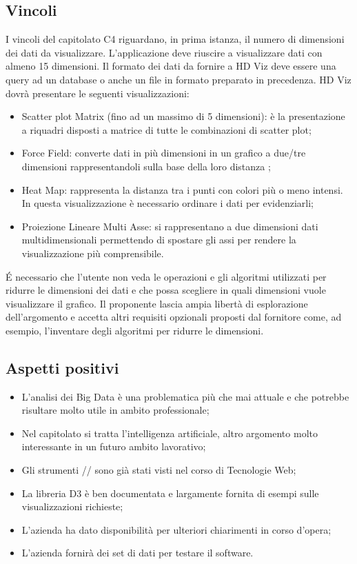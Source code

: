 \subsection{Vincoli}
I vincoli del capitolato C4 riguardano, in prima istanza, il numero di dimensioni dei dati da visualizzare. L'applicazione deve riuscire a visualizzare dati con almeno 15 dimensioni. 
Il formato dei dati da fornire a HD Viz deve essere una query ad un database o anche un file in formato  preparato in precedenza.
HD Viz dovrà presentare le seguenti visualizzazioni: 
\begin{itemize}
\item Scatter plot Matrix (fino ad un massimo di 5 dimensioni): è la presentazione a riquadri disposti a matrice di tutte le combinazioni di scatter plot; 
\item Force Field: converte dati in più dimensioni in un grafico a due/tre dimensioni rappresentandoli sulla base della loro distanza ; 
\item Heat Map: rappresenta la distanza tra i punti con colori più o meno intensi. In questa visualizzazione è necessario ordinare i dati per evidenziarli; 
\item Proiezione Lineare Multi Asse: si rappresentano a due dimensioni dati multidimensionali permettendo di spostare gli assi per rendere la visualizzazione più comprensibile.  
\end{itemize} 
\'E necessario che l'utente non veda le operazioni e gli algoritmi utilizzati per ridurre le dimensioni dei dati e che possa scegliere in quali dimensioni vuole visualizzare il grafico.
Il proponente lascia ampia libertà di esplorazione dell'argomento e accetta altri requisiti opzionali proposti dal fornitore come, ad esempio, l'inventare degli algoritmi per ridurre le dimensioni.

\subsection{Aspetti positivi}
\begin{itemize}
\item L'analisi dei Big Data è una problematica più che mai attuale e che potrebbe risultare molto utile in ambito professionale;
\item Nel capitolato si tratta l'intelligenza artificiale, altro argomento molto interessante in un futuro ambito lavorativo;
\item Gli strumenti // sono già stati visti nel corso di Tecnologie Web;
\item La libreria D3 è ben documentata e largamente fornita di esempi sulle visualizzazioni richieste;
\item L'azienda ha dato disponibilità per ulteriori chiarimenti in corso d'opera;
\item L'azienda fornirà dei set di dati per testare il software.
\end{itemize}

